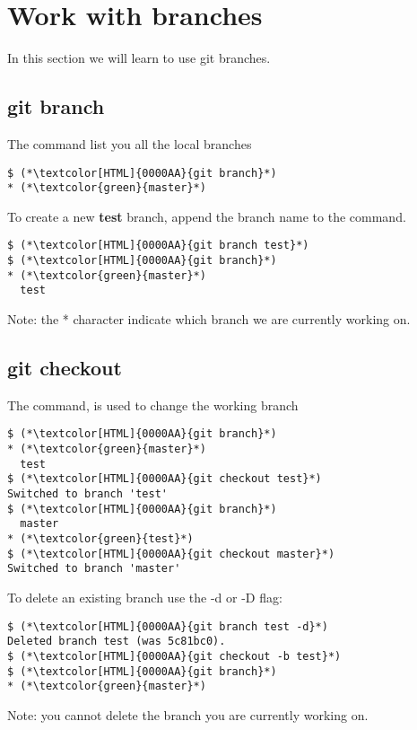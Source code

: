 \section{Work with branches}
\begin{frame}[fragile]
    \slidetitle
In this section we will learn to use git branches.

\end{frame}

\subsection{git branch}
\begin{frame}[fragile]
    \subslidetitle
The  command list you all the local branches
\begin{lstlisting}
$ (*\textcolor[HTML]{0000AA}{git branch}*)
* (*\textcolor{green}{master}*)
\end{lstlisting}

To create a new \textbf{test} branch, append the branch name to the command.
\begin{lstlisting}
$ (*\textcolor[HTML]{0000AA}{git branch test}*)
$ (*\textcolor[HTML]{0000AA}{git branch}*)
* (*\textcolor{green}{master}*)
  test
\end{lstlisting}

Note: the * character indicate which branch we are currently working on.
\end{frame}

\subsection{git checkout}
\begin{frame}[fragile]
    \subslidetitle
The  command, is used to change the working branch
\begin{lstlisting}
$ (*\textcolor[HTML]{0000AA}{git branch}*)
* (*\textcolor{green}{master}*)
  test
$ (*\textcolor[HTML]{0000AA}{git checkout test}*)
Switched to branch 'test'
$ (*\textcolor[HTML]{0000AA}{git branch}*)
  master
* (*\textcolor{green}{test}*)
$ (*\textcolor[HTML]{0000AA}{git checkout master}*)
Switched to branch 'master'
\end{lstlisting}

To delete an existing branch use the -d or -D flag:
\begin{lstlisting}
$ (*\textcolor[HTML]{0000AA}{git branch test -d}*)
Deleted branch test (was 5c81bc0).
$ (*\textcolor[HTML]{0000AA}{git checkout -b test}*)
$ (*\textcolor[HTML]{0000AA}{git branch}*)
* (*\textcolor{green}{master}*)
\end{lstlisting}

Note: you cannot delete the branch you are currently working on.

\end{frame}


